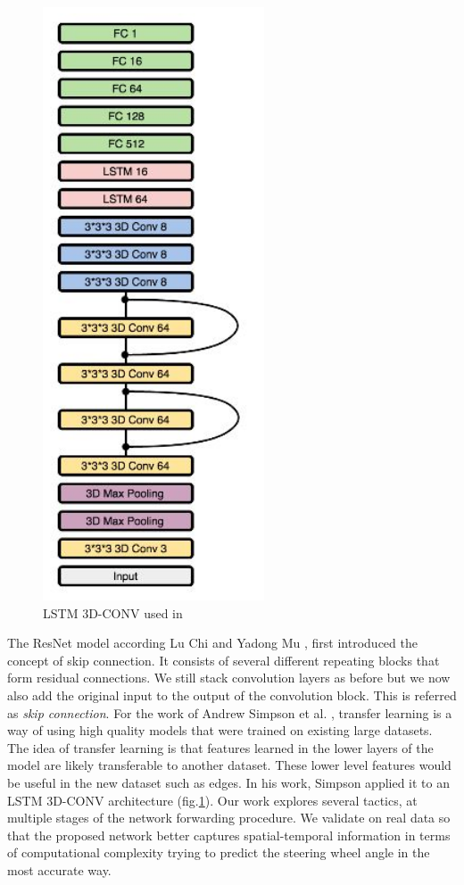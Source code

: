 \documentclass[10pt,twocolumn,letterpaper]{article}
\begin{document}
\begin{figure}
    \centering
    \includegraphics[scale=0.7]{images/image_2020-02-10_18-30-02.png}
    \caption{LSTM 3D-CONV used in \cite{Alpher01}}
    \label{fig:lstm}
\end{figure}

The ResNet model according Lu Chi and Yadong Mu \cite{Alpher04}, first introduced the concept of skip connection. It consists of several different repeating blocks that form residual connections. We still stack convolution layers as before but we now also add the original input to the output of the convolution block. This is referred as \textit{skip connection}. For the work of Andrew Simpson et al. \cite{Alpher01}, transfer learning is a way of using high quality models that were trained on existing large datasets. The idea of transfer learning is that features learned in the lower layers of the model are likely transferable to another dataset. These lower level features would be useful in the new dataset such as edges. In his work, Simpson applied it to an LSTM 3D-CONV architecture (fig.\ref{fig:lstm}). Our work explores several tactics, at multiple stages of the network forwarding procedure. We validate on real data so that the proposed network better captures spatial-temporal information in terms of computational complexity trying to predict the steering wheel angle in the most accurate way.
\end{document}
